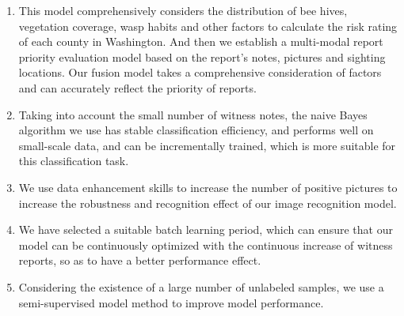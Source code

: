 \documentclass{mcmthesis}
\numberwithin{figure}{section}
\numberwithin{table}{section}
\begin{document}
\begin{enumerate}
  \item This model comprehensively considers the distribution of bee hives, vegetation coverage, wasp habits and other factors to calculate the risk rating of each county in Washington. And then we establish a multi-modal report priority evaluation model based on the report's notes, pictures and sighting locations. Our fusion model takes a comprehensive consideration of factors and can accurately reflect the priority of reports.
  \item Taking into account the small number of witness notes, the naive Bayes algorithm we use has stable classification efficiency, and performs well on small-scale data, and can be incrementally trained, which is more suitable for this classification task.
  \item We use data enhancement skills to increase the number of positive pictures to increase the robustness and recognition effect of our image recognition model.
  \item We have selected a suitable batch learning period, which can ensure that our model can be continuously optimized with the continuous increase of witness reports, so as to have a better performance effect.
  \item Considering the existence of a large number of unlabeled samples, we use a semi-supervised model method to improve model performance.
\end{enumerate}
\end{document}
